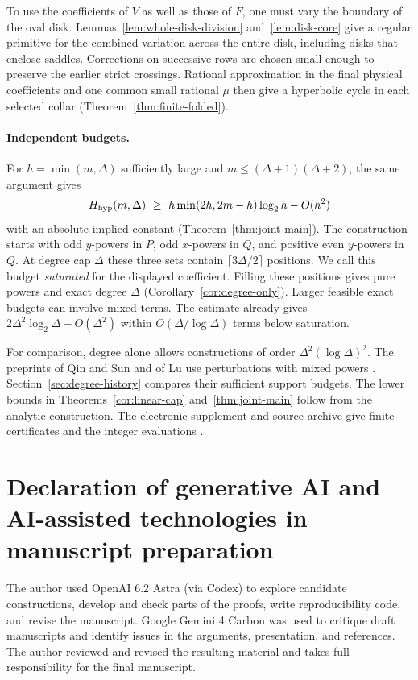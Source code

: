To use the coefficients of \(V\) as well as those of \(F\), one must vary the boundary of the oval disk. Lemmas~\ref{lem:whole-disk-division} and~\ref{lem:disk-core} give a regular primitive for the combined variation across the entire disk, including disks that enclose saddles. Corrections on successive rows are chosen small enough to preserve the earlier strict crossings. Rational approximation in the final physical coefficients and one common small rational \(\mu\) then give a hyperbolic cycle in each selected collar (Theorem~\ref{thm:finite-folded}).

\paragraph{Independent budgets.}
For \(h=\min(m,\Delta)\) sufficiently large and \(m\le(\Delta+1)(\Delta+2)\), the same argument gives
\[
 \Hhyp(m,\Delta)\ \ge\ h\min(2h,2m-h)\log_2h-O(h^2)
\]
with an absolute implied constant (Theorem~\ref{thm:joint-main}). The construction starts with odd \(y\)-powers in \(P\), odd \(x\)-powers in \(Q\), and positive even \(y\)-powers in \(Q\). At degree cap \(\Delta\) these three sets contain \(\lceil3\Delta/2\rceil\) positions. We call this budget \emph{saturated} for the displayed coefficient. Filling these positions gives pure powers and exact degree \(\Delta\) (Corollary~\ref{cor:degree-only}). Larger feasible exact budgets can involve mixed terms. The estimate already gives \(2\Delta^2\log_2\Delta-O(\Delta^2)\) within \(O(\Delta/\log\Delta)\) terms below saturation.

For comparison, degree alone allows constructions of order \(\Delta^2(\log\Delta)^2\). The preprints of Qin and Sun and of Lu use perturbations with mixed powers \cite{QinSun2026,LuMechanical}. Section~\ref{sec:degree-history} compares their sufficient support budgets. The lower bounds in Theorems~\ref{cor:linear-cap} and~\ref{thm:joint-main} follow from the analytic construction. The electronic supplement and source archive give finite certificates and the integer evaluations \cite{LuElectronic,LuReplay}.











\section*{Declaration of generative AI and AI-assisted technologies in manuscript preparation}
The author used OpenAI 6.2 Astra (via Codex) to explore candidate constructions, develop and check parts of the proofs, write reproducibility code, and revise the manuscript. Google Gemini 4 Carbon was used to critique draft manuscripts and identify issues in the arguments, presentation, and references. The author reviewed and revised the resulting material and takes full responsibility for the final manuscript.




